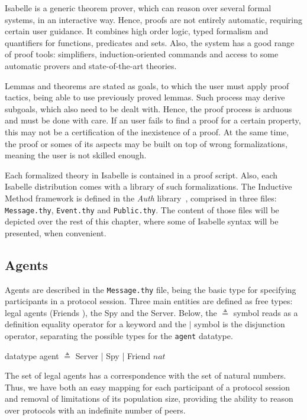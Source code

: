 Isabelle is a generic theorem prover, which can reason over several formal systems, in an interactive way. Hence, proofs are not entirely automatic, requiring certain user guidance. It combines high order logic, typed formalism and quantifiers for functions, predicates and sets. Also, the system has a good range of proof tools: simplifiers, induction-oriented commands and access to some automatic provers and state-of-the-art theories.

Lemmas and theorems are stated as goals, to which the user must apply proof tactics, being able to use previously proved lemmas. Such process may derive subgoals, which also need to be dealt with. Hence, the proof process is arduous and must be done with care. If an user fails to find a proof for a certain property, this may not be a certification of the inexistence of a proof. At the same time, the proof or somes of its aspects may be built on top of wrong formalizations, meaning the user is not skilled enough.

Each formalized theory in Isabelle is contained in a proof script. Also, each Isabelle distribution comes with a library of such formalizations. The Inductive Method framework is defined in the \textit{Auth} library~\cite{isabelle-hol-auth}, comprised in three files: \texttt{Message.thy}, \texttt{Event.thy} and \texttt{Public.thy}. The content of those files will be depicted over the rest of this chapter, where some of Isabelle syntax will be presented, when convenient.



\subsection{Agents}
Agents are described in the \texttt{Message.thy} file, being the basic type for specifying participants in a protocol session. Three main entities are defined as free types: legal agents (Friends ), the Spy and the Server. Below, the \( \triangleq \) symbol reads as a definition equality operator for a keyword and the \(|\) symbol is the disjunction operator, separating the possible types for the \texttt{agent} datatype.

\begin{center}
  {\ttfamily datatype agent \( \triangleq \) Server | Spy | Friend \(nat\)}
\end{center}

The set of legal agents has a correspondence with the set of natural numbers. Thus, we have both an easy mapping for each participant of a protocol session and removal of limitations of its population size, providing the ability to reason over protocols with an indefinite number of peers.

